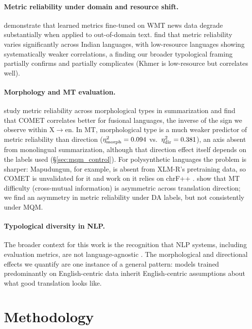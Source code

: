 \documentclass[11pt]{article}
\begin{document}
\paragraph{Metric reliability under domain and resource shift.}
\citet{zouhar2024domain} demonstrate that learned metrics fine-tuned on WMT news data degrade substantially when applied to out-of-domain text. \citet{yari2025item} find that metric reliability varies significantly across Indian languages, with low-resource languages showing systematically weaker correlations, a finding our broader typological framing partially confirms and partially complicates (Khmer is low-resource but correlates well).

\paragraph{Morphology and MT evaluation.}
\citet{mondshine2025ngrams} study metric reliability across morphological types in summarization and find that COMET correlates better for fusional languages, the inverse of the sign we observe within X$\to$en. In MT, morphological type is a much weaker predictor of metric reliability than direction ($\eta^2_{\text{morph}}=0.094$ vs.\ $\eta^2_{\text{dir}}=0.381$), an axis absent from monolingual summarization, although that direction effect itself depends on the labels used (\S\ref{sec:mqm_control}). For polysynthetic languages the problem is sharper: Mapudungun, for example, is absent from XLM-R's pretraining data, so COMET is unvalidated for it and work on it relies on chrF++ \citep{thompson-etal-2026-bringing}. \citet{bugliarello2020xmi} show that MT difficulty (cross-mutual information) is asymmetric across translation direction; we find an asymmetry in metric reliability under DA labels, but not consistently under MQM.

\paragraph{Typological diversity in NLP.}
The broader context for this work is the recognition that NLP systems, including evaluation metrics, are not language-agnostic \cite{costa2022no}. The morphological and directional effects we quantify are one instance of a general pattern: models trained predominantly on English-centric data inherit English-centric assumptions about what good translation looks like.

\section{Methodology}
\label{sec:method}
\end{document}
